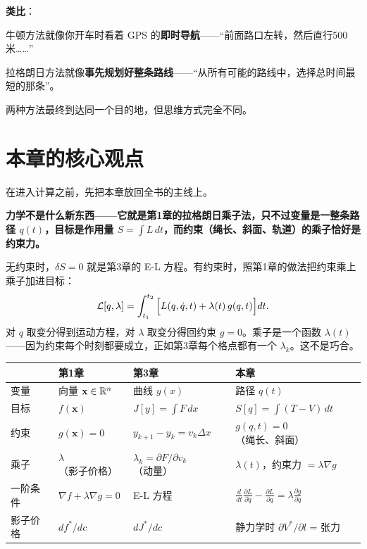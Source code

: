 \begin{insightbox}
\textbf{类比}：

牛顿方法就像你开车时看着 GPS 的\textbf{即时导航}——“前面路口左转，然后直行500米……”

拉格朗日方法就像\textbf{事先规划好整条路线}——“从所有可能的路线中，选择总时间最短的那条”。

两种方法最终到达同一个目的地，但思维方式完全不同。
\end{insightbox}

\section{本章的核心观点}

在进入计算之前，先把本章放回全书的主线上。

\begin{tcolorbox}[colback=yellow!10, colframe=orange!80, title=核心观点]
\textbf{力学不是什么新东西——它就是第1章的拉格朗日乘子法，只不过变量是一整条路径 $q(t)$，目标是作用量 $S = \int L\,dt$，而约束（绳长、斜面、轨道）的乘子恰好是约束力。}

无约束时，$\delta S = 0$ 就是第3章的 E-L 方程。有约束时，照第1章的做法把约束乘上乘子加进目标：
\[
\mathcal{L}[q, \lambda] = \int_{t_1}^{t_2} \Big[ L(q, \dot{q}, t) + \lambda(t)\, g(q, t) \Big] dt .
\]
对 $q$ 取变分得到运动方程，对 $\lambda$ 取变分得回约束 $g = 0$。乘子是一个函数 $\lambda(t)$——因为约束每个时刻都要成立，正如第3章每个格点都有一个 $\lambda_k$。这不是巧合。
\end{tcolorbox}

\begin{center}
\renewcommand{\arraystretch}{1.4}
\small
\begin{tabular}{llll}
\toprule
& \textbf{第1章} & \textbf{第3章} & \textbf{本章} \\
\midrule
变量 & 向量 $\mathbf{x} \in \mathbb{R}^n$ & 曲线 $y(x)$ & 路径 $q(t)$ \\
目标 & $f(\mathbf{x})$ & $J[y] = \int F\,dx$ & $S[q] = \int (T - V)\,dt$ \\
约束 & $g(\mathbf{x}) = 0$ & $y_{k+1} - y_k = v_k \Delta x$ & $g(q, t) = 0$（绳长、斜面） \\
乘子 & $\lambda$（影子价格） & $\lambda_k = \partial F / \partial v_k$（动量） & $\lambda(t)$，约束力 $= \lambda \nabla g$ \\
一阶条件 & $\nabla f + \lambda \nabla g = 0$ & E-L 方程 & $\frac{d}{dt}\frac{\partial L}{\partial \dot{q}} - \frac{\partial L}{\partial q} = \lambda \frac{\partial g}{\partial q}$ \\
影子价格 & $df^*/dc$ & $dJ^*/dc$ & 静力学时 $\partial V^*/\partial l$ = 张力 \\
\bottomrule
\end{tabular}
\end{center}

